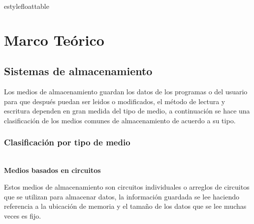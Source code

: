 estylefloat{table}
  \chapter{Marco Te\'{o}rico}
  \label{chap:cap1}
    \section {Sistemas de almacenamiento}

Los medios de almacenamiento guardan los datos de los programas o del usuario para que despu\'{e}s puedan ser leidos o modificados, el m\'{e}todo de lectura y escritura dependen en gran medida del tipo de medio, a continuaci\'{o}n se hace una clasificaci\'{o}n de los medios comunes de almacenamiento de acuerdo a su tipo.

\subsection {Clasificaci\'{o}n por tipo de medio}

\textbf{\\ Medios basados en circuitos \\}

Estos medios de almacenamiento son circuitos individuales o arreglos de circuitos que se utilizan para almacenar datos, la informaci\'{o}n guardada se lee haciendo referencia a la ubicaci\'{o}n de memoria y el tama\~{n}o de los datos que se lee muchas veces es fijo.

